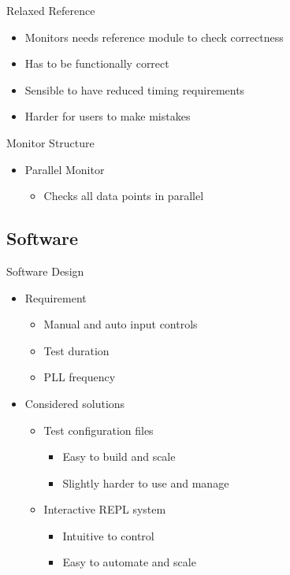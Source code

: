 \documentclass[t]{beamer}
\begin{document}
\begin{frame}{Relaxed Reference}
  \begin{itemize}
    \item Monitors needs reference module to check correctness
    \item Has to be functionally correct
    \item Sensible to have reduced timing requirements
    \item Harder for users to make mistakes
  \end{itemize}
\end{frame}

\begin{frame}{Monitor Structure}
  \begin{itemize}
    \item Parallel Monitor
    \begin{itemize}
      \item Checks all data points in parallel
    \end{itemize}
  \end{itemize}
  \begin{figure}[H]
    \centering
    \resizebox{0.8\textwidth}{!}{%
      
    }
  \end{figure}
\end{frame}

\subsection{Software}
\begin{frame}{Software Design}
  \begin{itemize}
    \item<+-> Requirement
    \begin{itemize}
      \item Manual and auto input controls
      \item Test duration
      \item PLL frequency \newline
    \end{itemize}
    \item<+-> Considered solutions
    \begin{itemize}
      \item Test configuration files
      \begin{itemize}
        \item Easy to build and scale
        \item Slightly harder to use and manage
      \end{itemize}
      \item Interactive REPL system
      \begin{itemize}
        \item Intuitive to control
        \item Easy to automate and scale
      \end{itemize}
    \end{itemize}
  \end{itemize}
\end{frame}
\end{document}
